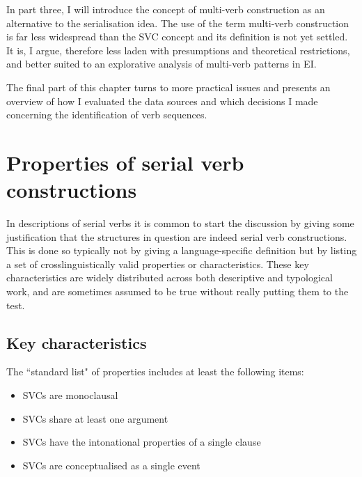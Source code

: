 In part three, I will introduce the concept of multi-verb construction as an alternative to the serialisation idea. The use of the term multi-verb construction is far less widespread than the SVC concept and its definition is not yet settled. It is, I argue, therefore less laden with presumptions and theoretical restrictions, and better suited to an explorative analysis of multi-verb patterns in EI. 

The final part of this chapter turns to more practical issues and presents an overview of how I evaluated the data sources and which decisions I made concerning the identification of verb sequences. 

\section{Properties of serial verb constructions} \label{section:properties}

In descriptions of serial verbs it is common to start the discussion by giving some justification that the structures in question are indeed serial verb constructions. This is done so typically not by giving a language-specific definition but by listing a set of crosslinguistically valid properties or characteristics. These key characteristics are widely distributed across both descriptive and typological work, and are sometimes assumed to be true without really putting them to the test. 

\subsection{Key characteristics} \label{subsection:keychars}

The ``standard list" of properties includes at least the following items:

\begin{itemize}
\item SVCs are monoclausal
\item SVCs share at least one argument
\item SVCs have the intonational properties of a single clause
\item SVCs are conceptualised as a single event
\end{itemize}

